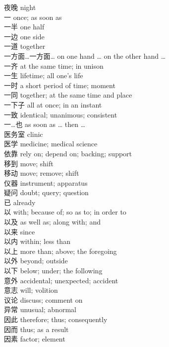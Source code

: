 夜晚 \quad night\\
一 \quad once; as soon as\\
一半 \quad one half\\
一边 \quad one side\\
一道 \quad together\\
一方面…一方面… \quad on one hand … on the other hand …\\
一齐 \quad at the same time; in unison\\
一生 \quad lifetime; all one's life\\
一时 \quad a short period of time; moment\\
一同 \quad together; at the same time and place\\
一下子 \quad all at once; in an instant\\
一致 \quad identical; unanimous; consistent\\
一…也 \quad as soon as … then …\\
医务室 \quad clinic\\
医学 \quad medicine; medical science\\
依靠 \quad rely on; depend on; backing; support\\
移到 \quad move; shift\\
移动 \quad move; remove; shift\\
仪器 \quad instrument; apparatus\\
疑问 \quad doubt; query; question\\
已 \quad already\\
以 \quad with; because of; so as to; in order to\\
以及 \quad as well as; along with; and\\
以来 \quad since\\
以内 \quad within; less than\\
以上 \quad more than; above; the foregoing\\
以外 \quad beyond; outside\\
以下 \quad below; under; the following\\
意外 \quad accidental; unexpected; accident\\
意志 \quad will; volition\\
议论 \quad discuss; comment on\\
异常 \quad unusual; abnormal\\
因此 \quad therefore; thus; consequently\\
因而 \quad thus; as a result\\
因素 \quad factor; element\\
